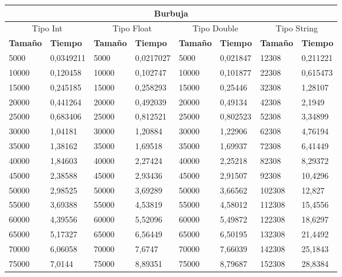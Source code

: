 \documentclass[11pt]{article}
\begin{document}
\begin{table}[!ht]
    \centering
    \small
    \begin{tabular}{|l|l|l|l|l|l|l|l|}
    \hline
    \multicolumn{8}{|c|}{\cellcolor{blue!20}\textbf{Burbuja}} \\ \hline
    \multicolumn{2}{|c|}{\cellcolor{gray!20}Tipo Int} & \multicolumn{2}{c|}{\cellcolor{gray!20}Tipo Float} & \multicolumn{2}{c|}{\cellcolor{gray!20}Tipo Double} & \multicolumn{2}{c|}{\cellcolor{gray!20}Tipo String}\\ \hline
        \textbf{Tamaño} & \textbf{Tiempo} & \textbf{Tamaño} & \textbf{Tiempo} & \textbf{Tamaño} & \textbf{Tiempo} & \textbf{Tamaño} & \textbf{Tiempo} \\ \hline
        5000 & 0,0349211 & 5000 & 0,0217027 & 5000 & 0,021847 & 12308 & 0,211221 \\ \hline
        10000 & 0,120458 & 10000 & 0,102747 & 10000 & 0,101877 & 22308 & 0,615473 \\ \hline
        15000 & 0,245185 & 15000 & 0,258293 & 15000 & 0,25446 & 32308 & 1,28107 \\ \hline
        20000 & 0,441264 & 20000 & 0,492039 & 20000 & 0,49134 & 42308 & 2,1949 \\ \hline
        25000 & 0,683406 & 25000 & 0,812521 & 25000 & 0,802523 & 52308 & 3,34899 \\ \hline
        30000 & 1,04181 & 30000 & 1,20884 & 30000 & 1,22906 & 62308 & 4,76194 \\ \hline
        35000 & 1,38162 & 35000 & 1,69518 & 35000 & 1,69937 & 72308 & 6,41449 \\ \hline
        40000 & 1,84603 & 40000 & 2,27424 & 40000 & 2,25218 & 82308 & 8,29372 \\ \hline
        45000 & 2,38588 & 45000 & 2,93436 & 45000 & 2,91507 & 92308 & 10,4296 \\ \hline
        50000 & 2,98525 & 50000 & 3,69289 & 50000 & 3,66562 & 102308 & 12,827 \\ \hline
        55000 & 3,69388 & 55000 & 4,53819 & 55000 & 4,58012 & 112308 & 15,4556 \\ \hline
        60000 & 4,39556 & 60000 & 5,52096 & 60000 & 5,49872 & 122308 & 18,6297 \\ \hline
        65000 & 5,17327 & 65000 & 6,56449 & 65000 & 6,50195 & 132308 & 21,4492 \\ \hline
        70000 & 6,06058 & 70000 & 7,6747 & 70000 & 7,66039 & 142308 & 25,1843 \\ \hline
        75000 & 7,0144 & 75000 & 8,89351 & 75000 & 8,79687 & 152308 & 28,8384 \\ \hline

\end{tabular}
\end{table}
\end{document}

